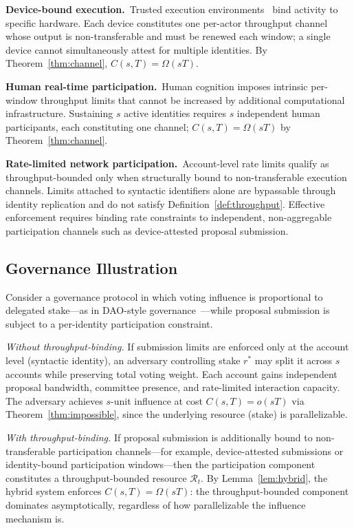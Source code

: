 \documentclass[10pt,journal,compsoc]{IEEEtran}
\theoremstyle{remark}
\begin{document}
	\noindent\textbf{Device-bound execution.}\ 
	Trusted execution environments~\cite{costan2016intel}
	bind activity to specific hardware.
	Each device constitutes one per-actor throughput channel
	whose output is non-transferable and must be renewed
	each window; a single device cannot simultaneously
	attest for multiple identities.
	By Theorem~\ref{thm:channel}, $C(s,T) = \Omega(sT)$.
	
	\noindent\textbf{Human real-time participation.}\ 
	Human cognition imposes intrinsic per-window throughput
	limits that cannot be increased by additional
	computational infrastructure.
	Sustaining $s$ active identities requires $s$ independent
	human participants, each constituting one channel;
	$C(s,T) = \Omega(sT)$ by Theorem~\ref{thm:channel}.
	
	\noindent\textbf{Rate-limited network participation.}\ 
	Account-level rate limits qualify as throughput-bounded
	only when structurally bound to non-transferable
	execution channels.
	Limits attached to syntactic identifiers alone are
	bypassable through identity replication and do not
	satisfy Definition~\ref{def:throughput}.
	Effective enforcement requires binding rate constraints
	to independent, non-aggregable participation channels
	such as device-attested proposal submission.
	
	\subsection{Governance Illustration}
	\label{ssec:governance}
	
	Consider a governance protocol in which voting influence
	is proportional to delegated stake---as in
	DAO-style governance~\cite{buterin2014dao}---while
	proposal submission is subject to a per-identity
	participation constraint.
	
	\emph{Without throughput-binding.}
	If submission limits are enforced only at the account
	level (syntactic identity), an adversary controlling
	stake $r^*$ may split it across $s$ accounts while
	preserving total voting weight.
	Each account gains independent proposal bandwidth,
	committee presence, and rate-limited interaction
	capacity.
	The adversary achieves $s$-unit influence at cost
	$C(s,T) = o(sT)$ via Theorem~\ref{thm:impossible},
	since the underlying resource (stake) is parallelizable.
	
	\emph{With throughput-binding.}
	If proposal submission is additionally bound to
	non-transferable participation channels---for example,
	device-attested submissions or identity-bound
	participation windows---then the participation
	component constitutes a throughput-bounded resource
	$\mathcal{R}_t$.
	By Lemma~\ref{lem:hybrid}, the hybrid system enforces
	$C(s,T) = \Omega(sT)$: the throughput-bounded
	component dominates asymptotically, regardless of
	how parallelizable the influence mechanism is.
	
\end{document}

